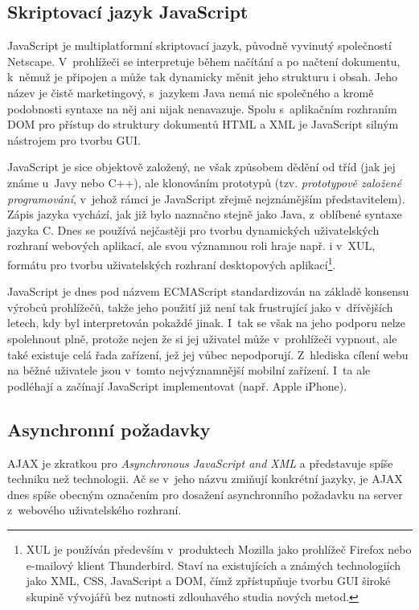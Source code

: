 \subsection{Skriptovací jazyk JavaScript}\label{javaScript}
JavaScript je multiplatformní skriptovací jazyk, původně vyvinutý
společností Netscape. V~prohlížeči se interpretuje během načítání a po
načtení dokumentu, k~němuž je připojen a může tak dynamicky měnit
jeho strukturu i obsah. Jeho název je čistě marketingový, s~jazykem
Java nemá nic společného a kromě podobnosti syntaxe na něj ani nijak
nenavazuje. Spolu s~aplikačním rozhraním DOM pro přístup do struktury
dokumentů HTML a XML je JavaScript silným nástrojem pro tvorbu GUI.
\cite{jsBook}

JavaScript je sice objektově založený, ne však způsobem
dědění od tříd (jak jej známe u~Javy nebo C++), ale klonováním
prototypů (tzv. {\it prototypově založené programování}, v~jehož rámci
je JavaScript zřejmě nej\-známějším představitelem). Zápis jazyka vychází,
jak již bylo naznačno stejně jako Java, z~oblíbené syntaxe jazyka C.
Dnes se používá nej\-častěji pro tvorbu dynamických uživatelských
rozhraní webových aplikací, ale svou významnou roli hraje např. i
v~XUL, formátu pro tvorbu uživatelských rozhraní desktopových
aplikací\footnote{XUL je používán především v~produktech Mozilla jako
prohlížeč Firefox nebo e-mailový klient Thunderbird. Staví na
existujících a známých technologiích jako XML, CSS, JavaScript a DOM,
čímž zpřístupňuje tvorbu GUI široké skupině vývojářů bez nutnosti
zdlouhavého studia nových metod.}.

JavaScript je dnes pod názvem ECMAScript standardizován na základě
konsensu výrobců prohlížečů, takže jeho použití již není tak
frustrující jako v~dřívějších letech, kdy byl interpretován pokaždé
jinak. I~tak se však na jeho podporu nelze spolehnout plně, protože
nejen že si jej uživatel může v~prohlížeči vypnout, ale také existuje
celá řada zařízení, jež jej vůbec nepodporují.
Z~hlediska cílení webu na běžné uživatele jsou v~tomto nej\-významnější
mobilní zařízení. I~ta ale podléhají a začínají JavaScript
implementovat (např. Apple iPhone).

\subsection{Asynchronní požadavky}\label{ajax}
AJAX je zkratkou pro {\it Asynchronous JavaScript and XML} a
představuje spíše techniku než technologii. Ač se v~jeho názvu
zmiňují konkrétní jazyky, je AJAX dnes spíše obecným označením pro
dosažení asynchronního požadavku na server z~webového uživatelského
rozhraní. \cite{ajax}


